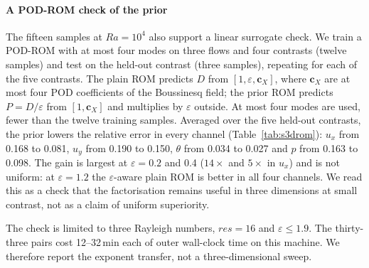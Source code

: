 \documentclass[preprint,11pt,a4paper,times]{elsarticle}
\begin{document}
\paragraph{A POD-ROM check of the prior} The fifteen samples at $Ra=10^4$ also support a
linear surrogate check. We train a POD-ROM with at most four modes on three flows and four
contrasts (twelve samples) and test on the held-out contrast (three samples),
repeating for each of the five contrasts. The plain ROM predicts $D$ from
$[1,\varepsilon,\bm c_X]$, where $\bm c_X$ are at most four POD coefficients of the
Boussinesq field; the prior ROM predicts $P=D/\varepsilon$ from
$[1,\bm c_X]$ and multiplies by $\varepsilon$ outside. At most four modes are used,
fewer than the twelve training samples. Averaged over the five held-out contrasts,
the prior lowers the relative error in every channel (Table~\ref{tab:s3drom}):
$u_x$ from 0.168 to 0.081, $u_y$ from 0.190 to 0.150, $\theta$ from 0.034 to
0.027 and $p$ from 0.163 to 0.098. The gain is largest at $\varepsilon=0.2$ and
0.4 ($14\times$ and $5\times$ in $u_x$) and is not uniform: at $\varepsilon=1.2$ the
$\varepsilon$-aware plain ROM is better in all four channels. We read this as a
check that the factorisation remains useful in three dimensions at small
contrast, not as a claim of uniform superiority.


The check is limited to three Rayleigh numbers, $res=16$ and $\varepsilon\le1.9$. The thirty-three
pairs cost 12--32\,min each of outer wall-clock time on this machine. We therefore report the
exponent transfer, not a three-dimensional sweep.
\end{document}
